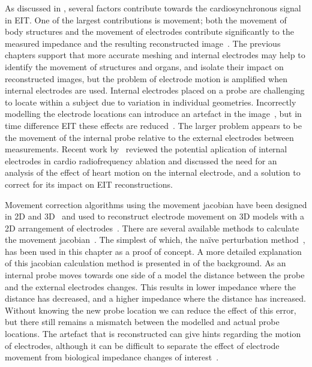 As discussed in , several factors contribute towards
the cardiosynchronous signal in EIT. One of the largest contributions 
is movement; both the movement of 
body structures and the movement of electrodes contribute significantly to the measured
impedance and the resulting reconstructed 
image~\parencite{adler_origins_2017,proenca_influence_2015}.
The previous chapters support that more accurate meshing and internal electrodes may
help to identify the movement of structures and organs, and isolate their impact on
reconstructed images, but the problem of electrode motion is amplified when internal
electrodes are used. 
Internal electrodes placed on a probe are challenging to locate within a subject
due to variation in individual geometries. Incorrectly modelling the electrode 
locations can introduce an artefact in the image~\parencite{boyle_impact_2011}, 
but in time difference EIT these effects are reduced~\parencite{adler_electrical_2017}. 
The larger problem appears 
to be the 
movement of the internal probe relative to the external electrodes between
measurements. Recent work by~
reviewed the potential aplication of internal electrodes in cardio 
radiofrequency ablation and discussed the need for an analysis 
of the effect of heart motion on the internal electrode, and a solution 
to correct for its impact on EIT reconstructions.

Movement correction algorithms using the movement jacobian have been 
designed in 2D 
and 3D~\parencite{gomez-laberge_direct_2007,soleimani_imaging_2006,gomez-laberge_direct_2008}
and used to reconstruct electrode movement on 3D models with a 2D arrangement 
of electrodes~\parencite{boyle_geophysical_2016}. 
There are several available methods to calculate the movement 
jacobian~\parencite{boyle_methods_2017}. The simplest of which,
the na\"{i}ve perturbation method~\parencite{gomez-laberge_direct_2008},
has been used in this chapter as a proof of concept.  
A more detailed explanation of this jacobian calculation method is presented in 
 of the background.
As an internal probe moves towards one side of a model the distance between the 
probe and the external electrodes changes. This results in lower 
impedance where the distance 
has decreased, and a higher impedance where the distance has increased. Without knowing 
the new probe location we can reduce the effect of this error, but there still remains 
a mismatch between the modelled and actual probe locations. 
The artefact that is reconstructed can give hints regarding the motion of electrodes,
although it can be difficult to separate the effect of electrode movement 
from biological impedance changes of interest~\parencite{boyle_geophysical_2016}. 

